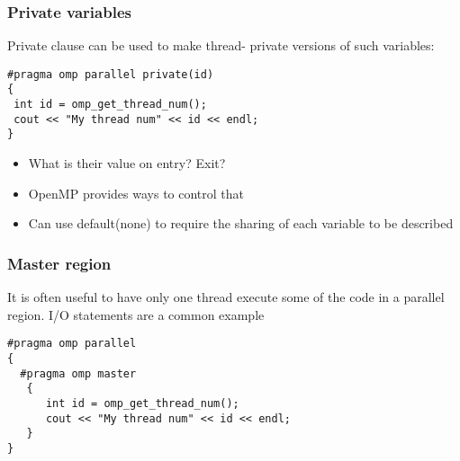 \documentclass{beamer}
\begin{document}
\begin{frame}
\frametitle{Private variables}

\begin{block}{}
Private clause can be used to make thread- private versions of such variables: 






\begin{verbatim}
#pragma omp parallel private(id)
{
 int id = omp_get_thread_num();
 cout << "My thread num" << id << endl; 
}

\end{verbatim}

\begin{itemize}
\item What is their value on entry? Exit?

\item OpenMP provides ways to control that

\item Can use default(none) to require the sharing of each variable to be described
\end{itemize}

\noindent
\end{block}
\end{frame}

\begin{frame}
\frametitle{Master region}

\begin{block}{}
It is often useful to have only one thread execute some of the code in a parallel region. I/O statements are a common example









\begin{verbatim}
#pragma omp parallel 
{
  #pragma omp master
   {
      int id = omp_get_thread_num();
      cout << "My thread num" << id << endl; 
   } 
}

\end{verbatim}


\end{block}
\end{frame}
\end{document}
